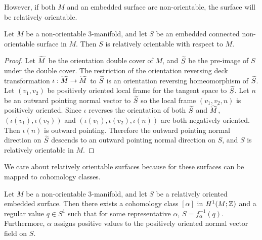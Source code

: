 However, if both $M$ and an embedded surface are non-orientable, the surface will be relatively orientable.
\begin{prop}
  \label{prop:relative-orientability}
  Let $M$ be a non-orientable $3$-manifold, and let $S$ be an embedded connected non-orientable surface in $M$.
  Then $S$ is relatively orientable with respect to $M$.
\end{prop}
\begin{proof}
  Let $\widetilde{M}$ be the orientation double cover of $M$, and $\widetilde{S}$ be the pre-image of $S$ under the double cover. The
  restriction of the orientation reversing deck transformation $\iota:\widetilde{M}\rightarrow\widetilde{M}$ to $\widetilde{S}$ is an orientation reversing homeomorphism of $\widetilde{S}$.
  Let $(v_1, v_2)$ be positively oriented local frame for the tangent space to $\widetilde{S}$. Let $n$ be an outward pointing normal vector to $\widetilde{S}$ so the local frame $(v_1, v_2, n)$ is positively oriented. Since $\iota$ reverses the orientation of both $\widetilde{S}$ and $\widetilde{M}$, $(\iota(v_1), \iota(v_2))$ and $(\iota(v_1), \iota(v_2), \iota(n))$ are both negatively oriented. Then $\iota(n)$ is outward pointing.
  Therefore the outward pointing normal direction on $\widetilde{S}$ descends to an outward pointing normal direction on $S$, and $S$ is relatively orientable in $M$.
\end{proof}

We care about relatively orientable surfaces because for these surfaces can be mapped to cohomology classes.
\begin{thm}
  \label{thm:Poincare-duality}
  Let $M$ be a non-orientable $3$-manifold, and let $S$ be a relatively oriented embedded
  surface. Then there exists a cohomology class $[\alpha]$ in $H^1(M; \mathbb{Z})$ and a regular value $q\in S^1$ such that for some
  representative $\alpha$, $S=f_{\alpha}^{-1}(q)$. Furthermore, $\alpha$ assigns positive values to the positively oriented normal vector
  field on $S$.
\end{thm}

